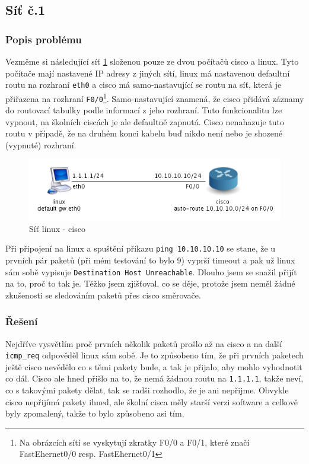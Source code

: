 \subsection{Síť č.1}
\subsubsection{Popis problému}
Vezměme si následující síť \ref{fig:sit_2pc} složenou pouze ze dvou počítačů cisco a linux. Tyto počítače mají nastavené IP adresy z jiných sítí, linux má nastavenou defaultní routu na rozhraní \verb|eth0| a cisco má samo-nastavující se routu na síť, která je přiřazena na rozhraní \verb|F0/0|\footnote{Na obrázcích sítí se vyskytují zkratky F0/0 a F0/1, které značí FastEhernet0/0 resp. FastEhernet0/1}. Samo-nastavující znamená, že cisco přidává záznamy do routovací tabulky podle informací z jeho rozhraní. Tuto funkcionalitu lze vypnout, na školních ciscách je ale defaultně zapnutá. Cisco nenahazuje tuto routu v případě, že na druhém konci kabelu buď nikdo není nebo je shozené (vypnuté) rozhraní.

\begin{figure}[h]
\begin{center}
\includegraphics[width=13cm]{figures/sit_2pc.png}
\caption{Síť linux - cisco}
\label{fig:sit_2pc}
\end{center}
\end{figure}

Při připojení na linux a spuštění příkazu \verb|ping 10.10.10.10| se stane, že u prvních pár paketů (při mém testování to bylo 9) vyprší timeout a pak už linux sám sobě vypisuje \verb|Destination Host Unreachable|. Dlouho jsem se snažil přijít na to, proč to tak je. Těžko jsem zjišťoval, co se děje, protože jsem neměl žádné zkušenosti se sledováním paketů přes cisco směrovače. 

\subsubsection{Řešení} 
Nejdříve vysvětlím proč prvních několik paketů prošlo až na cisco a na další \verb|icmp_req| odpověděl linux sám sobě. Je to způsobeno tím, že při prvních paketech ještě cisco nevědělo co s těmi pakety bude, a tak je přijalo, aby mohlo vyhodnotit co dál. Cisco ale hned přišlo na to, že nemá žádnou routu na \verb|1.1.1.1|, takže neví, co s takovými pakety dělat, tak se radši rozhodlo, že je ani nepřijme. Obvykle cisco nepřijímá pakety ihned, ale školní cisca měly starší verzi software a celkově byly zpomalený, takže to bylo způsobeno asi tím.

